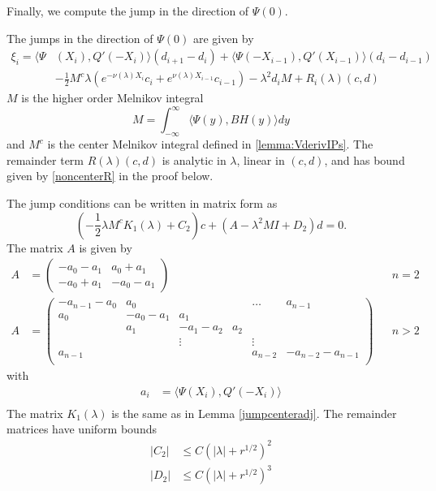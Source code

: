 \documentclass[thesis.tex]{subfiles}
\begin{document}
Finally, we compute the jump in the direction of $\Psi(0)$.

\begin{lemma}\label{jumpadj}
The jumps in the direction of $\Psi(0)$ are given by
\begin{equation}\label{jumpPsi0}
\begin{aligned}
\xi_i = \langle \Psi&(X_i), Q'(-X_i) \rangle (d_{i+1} - d_i ) + \langle \Psi(-X_{i-1}), Q'(X_{i-1}) \rangle (d_i - d_{i-1} ) \\
&- \frac{1}{2} M^c \lambda( e^{-\nu(\lambda)X_i}c_i + e^{\nu(\lambda)X_{i-1}}c_{i-1})
- \lambda^2 d_i M + R_i(\lambda)(c, d)
\end{aligned}
\end{equation}
$M$ is the higher order Melnikov integral
\begin{equation}\label{defM2}
M = \int_{-\infty}^\infty \langle \Psi(y), B H(y) \rangle dy
\end{equation}
and $M^c$ is the center Melnikov integral defined in \cref{lemma:VderivIPs}. The remainder term $R(\lambda)(c, d)$ is analytic in $\lambda$, linear in $(c, d)$, and has bound given by \cref{noncenterR} in the proof below. 

The jump conditions can be written in matrix form as
\begin{equation}
\left(-\frac{1}{2} \lambda M^c K_1(\lambda) + C_2 \right)c + (A - \lambda^2 M I + D_2)d = 0.
\end{equation}
The matrix $A$ is given by
\begin{align*}
A &= \begin{pmatrix}
-a_0 -a_1 & a_0 + a_1  \\
-a_0 + a_1 & -a_0 - a_1
\end{pmatrix} && n = 2 \\
A &= \begin{pmatrix}
-a_{n-1} - a_0 & a_0 & & & \dots & a_{n-1}\\
a_0 & -a_0 - a_1 &  a_1   \\
& a_1 & -a_1 - a_2 &  a_2 \\
& & \vdots & & \vdots \\
a_{n-1} & & & & a_{n-2} & -a_{n-2} - a_{n-1} \\
\end{pmatrix} && n > 2
\end{align*}
with
\begin{align*}
a_i &= \langle \Psi(X_i), Q'(-X_i) \rangle \\
\end{align*}
The matrix $K_1(\lambda)$ is the same as in Lemma \ref{jumpcenteradj}. The remainder matrices have uniform bounds
\begin{align}\label{adjjumprem}
|C_2| &\leq C (|\lambda| + r^{1/2})^2 \\
|D_2| &\leq C (|\lambda| + r^{1/2})^3 
\end{align}


\end{lemma}
\end{document}
